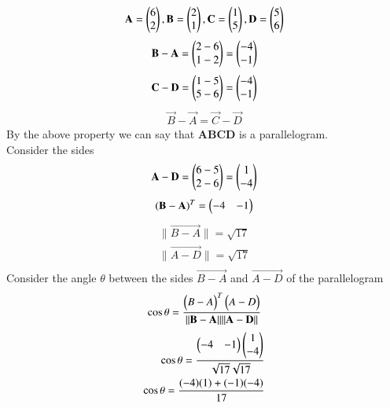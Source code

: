 \documentclass[journal,12pt,onecolumn]{IEEEtran}
\begin{document}
		\begin{align}
			\mathbf{A} = \begin{pmatrix}6\\2\end{pmatrix} ,\mathbf{B}=\begin{pmatrix}2\\1\end{pmatrix} ,\mathbf{C}=\begin{pmatrix}1\\5\end{pmatrix} , \mathbf{D}=\begin{pmatrix}5\\6\end{pmatrix}
		\end{align}
		\begin{align}
		    \mathbf{B}-\mathbf{A}=\begin{pmatrix}2-6\\1-2\end{pmatrix}=\begin{pmatrix}-4\\-1\end{pmatrix}
		\end{align}
        \begin{align}
            \mathbf{C}-\mathbf{D}=\begin{pmatrix}1-5\\5-6\end{pmatrix}=\begin{pmatrix}-4\\-1\end{pmatrix}
        \end{align}
        \begin{align}
            \vec{B}-\vec{A}=\vec{C}-\vec{D}
        \end{align}
        By the above property we can say that \textbf{ABCD} is a parallelogram.\\
        Consider the sides\\
        \begin{align}
            \mathbf{A-D}=\begin{pmatrix}6-5\\2-6\end{pmatrix}=\begin{pmatrix}1\\-4\end{pmatrix}
        \end{align}
        \begin{align}
            \mathbf{(B-A)}^T=\begin{pmatrix}-4 & -1\end{pmatrix}
        \end{align}
        \begin{align}
            \|\vec{B-A}\|=\sqrt{17}\\
            \|\vec{A-D}\|=\sqrt{17}\\
        \end{align}
      Consider the angle $\theta$ between the sides $\vec{B-A}$ and $\vec{A-D}$ of the parallelogram\\
      \begin{align}
      \cos{\theta}=\frac{\begin{pmatrix}B-A\end{pmatrix}^T\begin{pmatrix}A-D\end{pmatrix}}{\|\mathbf{B-A}\|\|\mathbf{A-D}\|}
      \end{align}
      \begin{align}
          \cos{\theta}=\frac{\begin{pmatrix}-4 & -1\end{pmatrix}\begin{pmatrix}1\\-4\end{pmatrix}}{\sqrt{17}\sqrt{17}}\\
          \cos{\theta}=\frac{(-4)(1)+(-1)(-4)}{17}\\
      \end{align}
\end{document}

